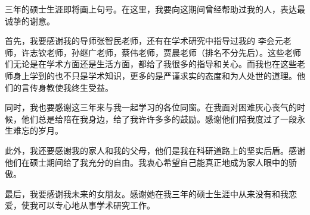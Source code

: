 

三年的硕士生涯即将画上句号。在这里，我要向这期间曾经帮助过我的人，表达最诚挚的谢意。

首先，我要感谢我的导师张智民老师，还有在学术研究中指导过我的 李会元老师，许志钦老师，孙继广老师，蔡伟老师，贾晨老师（排名不分先后）。这些老师们无论是在学术方面还是生活方面，都给了我很多的指导和关心。而我也在这些老师身上学到的也不只是学术知识，更多的是严谨求实的态度和为人处世的道理。他们的言传身教使我终生受益。

同时，我也要感谢这三年来与我一起学习的各位同窗。在我面对困难灰心丧气的时候，他们总是给陪在我身边，给了我许许多多的鼓励。感谢他们陪我度过了一段永生难忘的岁月。

此外，我还要感谢我的家人和我的父母，他们是我在科研道路上的坚实后盾。感谢他们在硕士期间给了我充分的自由。我衷心希望自己能真正地成为家人眼中的骄傲。

最后，我要感谢我未来的女朋友。感谢她在我三年的硕士生涯中从来没有和我恋爱，使我可以专心地从事学术研究工作。

